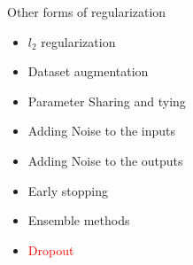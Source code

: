 \begin{frame}
\end{frame}

\begin{frame}
	\vspace{4em}
	\begin{overlayarea}{\textwidth}{\textheight}
		\begin{block}{Other forms of regularization}
			\begin{itemize}
				\item $l_2$ regularization
				\item Dataset augmentation
				\item Parameter Sharing and tying
				\item Adding Noise to the inputs
				\item Adding Noise to the outputs 
				\item Early stopping
				\item Ensemble methods
				\item \textcolor<2->{red}{Dropout}
			\end{itemize}
		\end{block}
	\end{overlayarea}
\end{frame}


